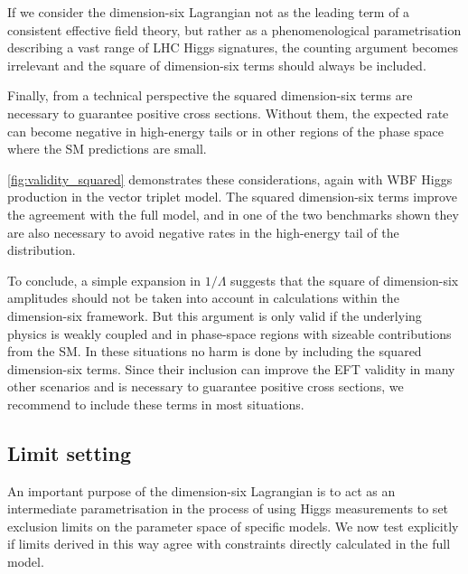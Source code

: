 If we consider the dimension-six Lagrangian not as the leading term of
a consistent effective field theory, but rather as a phenomenological
parametrisation describing a vast range of LHC Higgs signatures, the
counting argument becomes irrelevant and the square of dimension-six
terms should always be included.

Finally, from a technical perspective the squared dimension-six terms
are necessary to guarantee positive cross sections. Without them, the
expected rate can become negative in high-energy tails or in other
regions of the phase space where the SM predictions are small. 

\autoref{fig:validity_squared} demonstrates these considerations,
again with WBF Higgs production in the vector triplet model. The
squared dimension-six terms improve the agreement with the full model,
and in one of the two benchmarks shown they are also necessary to
avoid negative rates in the high-energy tail of the distribution.

To conclude, a simple expansion in $1/\Lambda$ suggests that the
square of dimension-six amplitudes should not be taken into account in
calculations within the dimension-six framework. But this argument is
only valid if the underlying physics is weakly coupled and in
phase-space regions with sizeable contributions from the SM. In these
situations no harm is done by including the squared dimension-six
terms. Since their inclusion can improve the EFT validity in many
other scenarios and is necessary to guarantee positive cross sections,
we recommend to include these terms in most situations.



\subsection{Limit setting}
\label{sec:validity_fits}

An important purpose of the dimension-six Lagrangian is to act as an
intermediate parametrisation in the process of using Higgs
measurements to set exclusion limits on the parameter space of
specific models. We now test explicitly if limits derived in this way agree
with constraints directly calculated in the full model.

